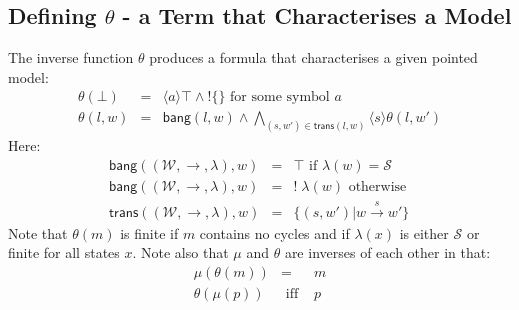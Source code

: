 \subsection{Defining $\theta$ - a Term that Characterises a Model}
The inverse function $\theta$ produces a formula that characterises a given pointed model:
\begin{eqnarray}
\theta(\bot) & = & \langle a \rangle \top \land ! \{ \} \mbox{ for some symbol }a \nonumber \\
\theta(l, w) & = & \mathsf{bang}(l,w) \land \bigwedge_{(s,w') \in \mathsf{trans}(l,w)} \langle s \rangle \theta(l, w') \nonumber 
\end{eqnarray}
Here:
\begin{eqnarray}
\mathsf{bang}((\mathcal{W},\rightarrow,\lambda),w) & = & \top \mbox{ if } \lambda(w) = \mathcal{S} \nonumber \\
\mathsf{bang}((\mathcal{W},\rightarrow,\lambda),w) & = & ! \; \lambda(w) \mbox{ otherwise } \nonumber \\
\mathsf{trans}((\mathcal{W},\rightarrow, \lambda),w) & = & \{(s,w') | w \xrightarrow{s} w' \} \nonumber
\end{eqnarray}
Note that $\theta(m)$ is finite if $m$ contains no cycles and if $\lambda(x)$ is either $\mathcal{S}$ or finite for all states $x$.
Note also that $\mu$ and $\theta$ are inverses of each other in that:
\begin{eqnarray}
\mu(\theta(m)) & = & m \nonumber \\
\theta(\mu(p)) & \mbox{ iff } & p \nonumber
\end{eqnarray}

